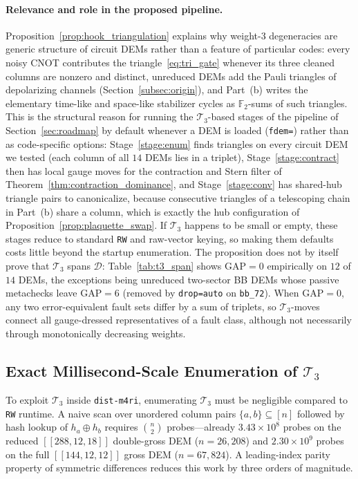 \documentclass[12pt]{article}
\theoremstyle{definition}
\newcommand{\Ftwo}{\mathbb{F}_2}
\newcommand{\Dc}{\mathcal{D}}
\newcommand{\Tc}{\mathcal{T}_3}
\newcommand{\ttt}[1]{\texttt{#1}}
\begin{document}
\paragraph{Relevance and role in the proposed pipeline.}
Proposition~\ref{prop:hook_triangulation} explains why weight-3 degeneracies are generic structure of circuit DEMs
rather than a feature of particular codes: every noisy CNOT contributes the triangle~\eqref{eq:tri_gate} whenever its
three cleaned columns are nonzero and distinct, unreduced DEMs add the Pauli triangles of depolarizing channels
(Section~\ref{subsec:origin}), and Part~(b) writes the elementary time-like and space-like stabilizer cycles as
$\Ftwo$-sums of such triangles. This is the structural reason for running the $\Tc$-based stages of the pipeline of
Section~\ref{sec:roadmap} by default whenever a DEM is loaded (\ttt{fdem=}) rather than as code-specific options:
Stage~\ref{stage:enum} finds triangles on every circuit DEM we tested (each column of all $14$ DEMs lies in a
triplet), Stage~\ref{stage:contract} then has local gauge moves for the contraction and Stern filter of
Theorem~\ref{thm:contraction_dominance}, and Stage~\ref{stage:conv} has shared-hub triangle pairs to canonicalize,
because consecutive triangles of a telescoping chain in Part~(b) share a column, which is exactly the hub
configuration of Proposition~\ref{prop:plaquette_swap}. If $\Tc$ happens to be small or empty, these stages reduce to
standard \ttt{RW} and raw-vector keying, so making them defaults costs little beyond the startup enumeration. The
proposition does not by itself prove that $\Tc$ spans $\Dc$: Table~\ref{tab:t3_span} shows $\mathrm{GAP} = 0$
empirically on $12$ of $14$ DEMs, the exceptions being unreduced two-sector BB DEMs whose passive metachecks leave
$\mathrm{GAP} = 6$ (removed by \ttt{drop=auto} on \ttt{bb\_72}). When $\mathrm{GAP} = 0$, any two error-equivalent
fault sets differ by a sum of triplets, so $\Tc$-moves connect all gauge-dressed representatives of a fault class,
although not necessarily through monotonically decreasing weights.

\subsection{Exact Millisecond-Scale Enumeration of \texorpdfstring{$\Tc$}{T3}}\label{subsec:enumeration}

To exploit $\Tc$ inside \ttt{dist-m4ri}, enumerating $\Tc$ must be negligible compared to \ttt{RW} runtime. A
naive scan over unordered column pairs $\{a, b\} \subseteq [n]$ followed by hash lookup of $h_a \oplus h_b$
requires $\binom{n}{2}$ probes---already $3.43 \times 10^8$ probes on the reduced $[[288, 12, 18]]$ double-gross
DEM ($n = 26{,}208$) and $2.30 \times 10^9$ probes on the full $[[144, 12, 12]]$ gross DEM ($n = 67{,}824$). A
leading-index parity property of symmetric differences reduces this work by three orders of magnitude.
\end{document}
